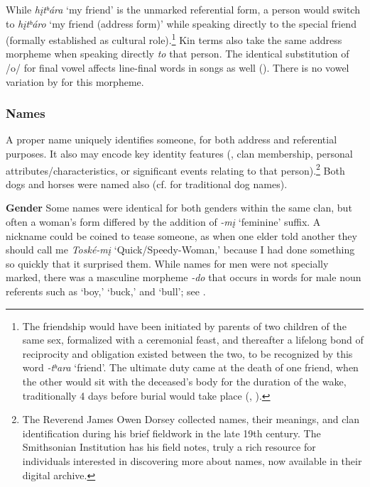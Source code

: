 \documentclass[output=paper]{LSP/langsci}
\begin{document}
While \textit{h\k{i}tʰára} `my friend' is the unmarked referential form, a person would switch to \textit{h\k{i}tʰáro} `my friend (address form)' while speaking directly to the special friend (formally established as cultural role).\footnote{The friendship would have been initiated by parents of two children of the same sex, formalized with a ceremonial feast, and thereafter a lifelong bond of reciprocity and obligation existed between the two, to be recognized by this word \textit{-tʰara} `friend'. The ultimate duty came at the death of one friend, when the other would sit with the deceased's body for the duration of the wake, traditionally 4 days before burial would take place (\citealt{Whitman1936}, \citealt{Davidson1997}).}  Kin terms also take the same address morpheme when speaking directly \textit{to} that person. The identical substitution of /o/ for  final vowel affects line-final words in songs as well (\citealt{Davidson1997}).  There is no vowel variation by  for this morpheme.         
  
\subsubsection{Names}  A proper name uniquely identifies someone, for both address and referential purposes. It also may encode key identity features (, clan membership, personal attributes/characteristics, or significant events relating to that person).\footnote{The Reverend James Owen Dorsey collected names, their meanings, and clan identification during his brief fieldwork in the late 19th century. The Smithsonian Institution has his field notes, truly a rich resource for individuals interested in discovering more about names, now available in their digital archive.}  Both dogs and horses were named also (cf. \citealt{Whitman1936} for traditional  dog names).  

\textbf{Gender} Some names were identical for both genders within the same clan, but often a woman's form differed by the addition of \textit{-m\k{i}} `feminine' suffix.  A nickname could be coined to tease someone, as when one elder told another they should call me \textit{Toské-m\k{i}} `Quick/Speedy-Woman,' because I had done something so quickly that it surprised them. While names for men were not specially marked, there was a masculine morpheme \textit{-do} that occurs in words for male noun referents such as `boy,' `buck,' and `bull'; see .  
\end{document}
